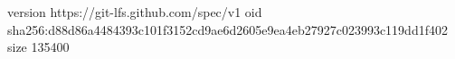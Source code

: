 version https://git-lfs.github.com/spec/v1
oid sha256:d88d86a4484393c101f3152cd9ae6d2605e9ea4eb27927c023993c119dd1f402
size 135400
